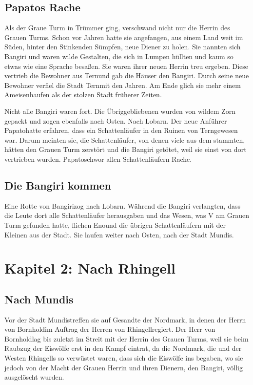 \documentclass[12pt,a4paper,onecolumn,twoside,ngerman]{book}
\newcommand{\Tern}{Tern}
\newcommand{\Bangiri}{Bangiri}
\newcommand{\Papato}{Papato}
\newcommand{\Eno}{Eno}
\newcommand{\Lobarn}{Lobarn}
\newcommand{\Nordmark}{Nordmark}
\newcommand{\Bornhold}{Bornhold}
\newcommand{\Rhingell}{Rhingell}
\newcommand{\Mundis}{Mundis}
\begin{document}
\section{Papatos Rache}

Als der Graue Turm in Trümmer ging, verschwand nicht nur die Herrin des Grauen Turms. Schon vor Jahren hatte sie angefangen, aus einem Land weit im Süden, hinter den Stinkenden Sümpfen, neue Diener zu holen. Sie nannten sich Bangiri und waren wilde Gestalten, die sich in Lumpen hüllten und kaum so etwas wie eine Sprache besaßen. 
Sie waren ihrer neuen Herrin treu ergeben. Diese vertrieb die Bewohner aus \Tern und gab die Häuser den Bangiri. Durch seine neue Bewohner verfiel die Stadt \Tern mit den Jahren. Am Ende glich sie mehr einem Ameisenhaufen als der stolzen Stadt früherer Zeiten.

Nicht alle Bangiri waren fort. Die Übriggebliebenen wurden von wildem Zorn gepackt und zogen ebenfalls nach Osten. Nach \Lobarn. Der neue Anführer \Papato hatte erfahren, dass ein Schattenläufer in den Ruinen von \Tern gewesen war. Darum meinten sie, die Schattenläufer, von denen viele aus dem \Enland stammten, hätten den Grauen Turm zerstört und die Bangiri getötet, weil sie einst von dort vertrieben wurden. \Papato schwor allen Schattenläufern Rache.

\section{Die Bangiri kommen}
Eine Rotte von \Bangiri zog nach \Lobarn.
Während die Bangiri verlangten, dass die Leute dort alle Schattenläufer herausgaben und das Wesen, was V am Grauen Turm gefunden hatte, fliehen \Eno und die übrigen Schattenläufern mit der Kleinen aus der Stadt. Sie laufen weiter nach Osten, nach der Stadt \Mundis.

\chapter{Kapitel 2: Nach \Rhingell}

\section{Nach \Mundis}
Vor der Stadt \Mundis treffen sie auf Gesandte der \Nordmark, in denen der Herrn von \Bornhold im Auftrag der Herren von \Rhingell regiert.
Der Herr von \Bornhold lag bis zuletzt im Streit mit der Herrin des Grauen Turms, weil sie beim Raubzug der Eiswölfe erst in den Kampf  eintrat, da die \Nordmark, die \Bergmark und der Westen \Rhingell{s} so verwüstet waren, dass sich die Eiswölfe ins \Enland begaben, wo sie jedoch von der Macht der Grauen Herrin und ihren Dienern, den Bangiri, völlig ausgelöscht wurden. 
\end{document}
